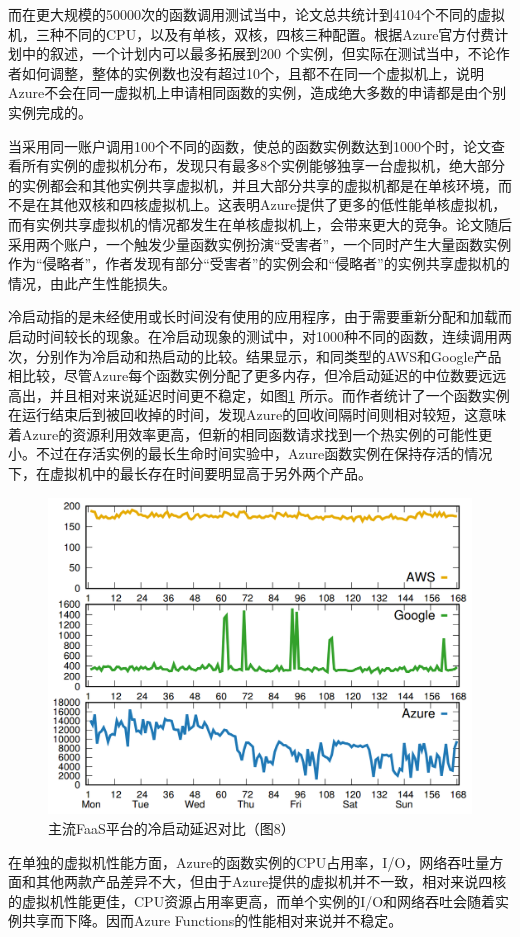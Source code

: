 \documentclass[11pt]{article}
\begin{document}
而在更大规模的50000次的函数调用测试当中，论文总共统计到4104个不同的虚拟机，三种不同的CPU，以及有单核，双核，四核三种配置。根据Azure官方付费计划中的叙述，一个计划内可以最多拓展到200 个实例，但实际在测试当中，不论作者如何调整，整体的实例数也没有超过10个，且都不在同一个虚拟机上，说明Azure不会在同一虚拟机上申请相同函数的实例，造成绝大多数的申请都是由个别实例完成的。

当\cite{wang2018peeking}采用同一账户调用100个不同的函数，使总的函数实例数达到1000个时，论文查看所有实例的虚拟机分布，发现只有最多8个实例能够独享一台虚拟机，绝大部分的实例都会和其他实例共享虚拟机，并且大部分共享的虚拟机都是在单核环境，而不是在其他双核和四核虚拟机上。这表明Azure提供了更多的低性能单核虚拟机，而有实例共享虚拟机的情况都发生在单核虚拟机上，会带来更大的竞争。论文随后采用两个账户，一个触发少量函数实例扮演“受害者”，一个同时产生大量函数实例作为“侵略者”，作者发现有部分“受害者”的实例会和“侵略者”的实例共享虚拟机的情况，由此产生性能损失。

冷启动指的是未经使用或长时间没有使用的应用程序，由于需要重新分配和加载而启动时间较长的现象。在冷启动现象的测试中，\cite{wang2018peeking}对1000种不同的函数，连续调用两次，分别作为冷启动和热启动的比较。结果显示，和同类型的AWS和Google产品相比较，尽管Azure每个函数实例分配了更多内存，但冷启动延迟的中位数要远远高出，并且相对来说延迟时间更不稳定，如图\ref{figs:cold} 所示。而作者统计了一个函数实例在运行结束后到被回收掉的时间，发现Azure的回收间隔时间则相对较短，这意味着Azure的资源利用效率更高，但新的相同函数请求找到一个热实例的可能性更小。不过在存活实例的最长生命时间实验中，Azure函数实例在保持存活的情况下，在虚拟机中的最长存在时间要明显高于另外两个产品。
\begin{figure}[!htbp]
	\centering
	\includegraphics[scale=0.5]{figs/ColdStart.PNG}
	\caption{主流FaaS平台的冷启动延迟对比（\cite{wang2018peeking}图8）}
	\label{figs:cold}
\end{figure}
在单独的虚拟机性能方面，Azure的函数实例的CPU占用率，I/O，网络吞吐量方面和其他两款产品差异不大，但由于Azure提供的虚拟机并不一致，相对来说四核的虚拟机性能更佳，CPU资源占用率更高，而单个实例的I/O和网络吞吐会随着实例共享而下降。因而Azure Functions的性能相对来说并不稳定。
\end{document}
